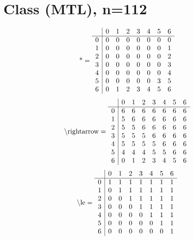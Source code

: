 \documentclass[11pt]{article}
\begin{document}
\section{Class (MTL), n=112}
\[\text{*} = 
\begin{array}{r | r r r r r r r}
 & 0 & 1 & 2 & 3 & 4 & 5 & 6 \\ \hline
0 & 0 & 0 & 0 & 0 & 0 & 0 & 0 \\
1 & 0 & 0 & 0 & 0 & 0 & 0 & 1 \\
2 & 0 & 0 & 0 & 0 & 0 & 0 & 2 \\
3 & 0 & 0 & 0 & 0 & 0 & 0 & 3 \\
4 & 0 & 0 & 0 & 0 & 0 & 0 & 4 \\
5 & 0 & 0 & 0 & 0 & 0 & 3 & 5 \\
6 & 0 & 1 & 2 & 3 & 4 & 5 & 6 \\
\end{array}
\]
\[\text{\textbackslash rightarrow} = 
\begin{array}{r | r r r r r r r}
 & 0 & 1 & 2 & 3 & 4 & 5 & 6 \\ \hline
0 & 6 & 6 & 6 & 6 & 6 & 6 & 6 \\
1 & 5 & 6 & 6 & 6 & 6 & 6 & 6 \\
2 & 5 & 5 & 6 & 6 & 6 & 6 & 6 \\
3 & 5 & 5 & 5 & 6 & 6 & 6 & 6 \\
4 & 5 & 5 & 5 & 5 & 6 & 6 & 6 \\
5 & 4 & 4 & 4 & 5 & 5 & 6 & 6 \\
6 & 0 & 1 & 2 & 3 & 4 & 5 & 6 \\
\end{array}
\]
\[\text{\textbackslash le} = 
\begin{array}{r | r r r r r r r}
 & 0 & 1 & 2 & 3 & 4 & 5 & 6 \\ \hline
0 & 1 & 1 & 1 & 1 & 1 & 1 & 1 \\
1 & 0 & 1 & 1 & 1 & 1 & 1 & 1 \\
2 & 0 & 0 & 1 & 1 & 1 & 1 & 1 \\
3 & 0 & 0 & 0 & 1 & 1 & 1 & 1 \\
4 & 0 & 0 & 0 & 0 & 1 & 1 & 1 \\
5 & 0 & 0 & 0 & 0 & 0 & 1 & 1 \\
6 & 0 & 0 & 0 & 0 & 0 & 0 & 1 \\
\end{array}
\]
\end{document}
